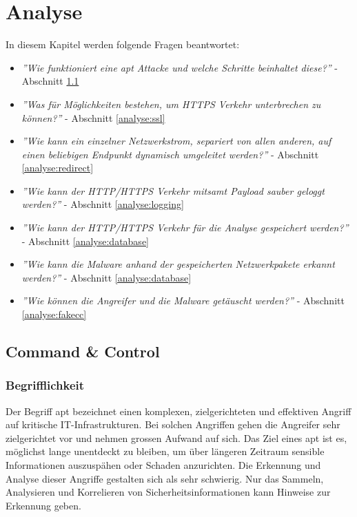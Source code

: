\chapter{Analyse}
\label{analyse:chapter}

In diesem Kapitel werden folgende Fragen beantwortet:
\begin{itemize}
	\item \textit{''Wie funktioniert eine \gls{apt} Attacke und welche Schritte beinhaltet diese?''} - Abschnitt \ref{analyse:cc}
	\item \textit{''Was für Möglichkeiten bestehen, um HTTPS Verkehr unterbrechen zu können?''} - Abschnitt \ref{analyse:ssl}
	\item \textit{''Wie kann ein einzelner Netzwerkstrom, separiert von allen anderen, auf einen beliebigen Endpunkt dynamisch umgeleitet werden?''} - Abschnitt \ref{analyse:redirect}
	\item \textit{''Wie kann der HTTP/HTTPS Verkehr mitsamt Payload sauber geloggt werden?''} - Abschnitt \ref{analyse:logging}
	\item \textit{''Wie kann der HTTP/HTTPS Verkehr für die Analyse gespeichert werden?''} - Abschnitt \ref{analyse:database}
	\item \textit{''Wie kann die Malware anhand der gespeicherten Netzwerkpakete erkannt werden?''} - Abschnitt \ref{analyse:database}
	\item \textit{''Wie können die Angreifer und die Malware getäuscht werden?''} - Abschnitt \ref{analyse:fakecc}
\end{itemize}


\section{Command \& Control}
\label{analyse:cc}
\subsection{Begrifflichkeit}
Der Begriff \gls{apt}\cite{wiki:apt} bezeichnet einen komplexen, zielgerichteten und effektiven Angriff auf kritische IT-Infrastrukturen. Bei solchen Angriffen gehen die Angreifer sehr zielgerichtet vor und nehmen grossen Aufwand auf sich. Das Ziel eines \gls{apt} ist es, möglichst lange unentdeckt  zu bleiben, um über längeren Zeitraum sensible Informationen auszuspähen oder Schaden anzurichten. Die Erkennung und Analyse dieser Angriffe gestalten sich als sehr schwierig. Nur das Sammeln, Analysieren und Korrelieren von Sicherheitsinformationen kann Hinweise zur Erkennung geben.


